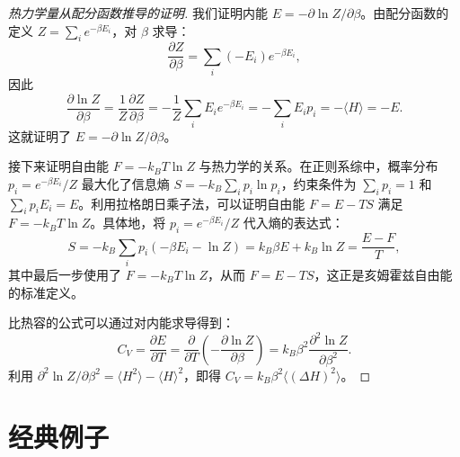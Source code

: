 \begin{proof}[热力学量从配分函数推导的证明]
我们证明内能 $E = -\partial \ln Z / \partial \beta$。由配分函数的定义 $Z = \sum_i e^{-\beta E_i}$，对 $\beta$ 求导：
\begin{equation}
    \frac{\partial Z}{\partial \beta} = \sum_i (-E_i) e^{-\beta E_i},
\end{equation}
因此
\begin{equation}
    \frac{\partial \ln Z}{\partial \beta} = \frac{1}{Z} \frac{\partial Z}{\partial \beta} = -\frac{1}{Z} \sum_i E_i e^{-\beta E_i} = -\sum_i E_i p_i = -\langle H \rangle = -E.
\end{equation}
这就证明了 $E = -\partial \ln Z / \partial \beta$。

接下来证明自由能 $F = -k_B T \ln Z$ 与热力学的关系。在正则系综中，概率分布 $p_i = e^{-\beta E_i}/Z$ 最大化了信息熵 $S = -k_B \sum_i p_i \ln p_i$，约束条件为 $\sum_i p_i = 1$ 和 $\sum_i p_i E_i = E$。利用拉格朗日乘子法，可以证明自由能 $F = E - TS$ 满足 $F = -k_B T \ln Z$。具体地，将 $p_i = e^{-\beta E_i}/Z$ 代入熵的表达式：
\begin{equation}
    S = -k_B \sum_i p_i (-\beta E_i - \ln Z) = k_B \beta E + k_B \ln Z = \frac{E - F}{T},
\end{equation}
其中最后一步使用了 $F = -k_B T \ln Z$，从而 $F = E - TS$，这正是亥姆霍兹自由能的标准定义。

比热容的公式可以通过对内能求导得到：
\begin{equation}
    C_V = \frac{\partial E}{\partial T} = \frac{\partial}{\partial T}\left(-\frac{\partial \ln Z}{\partial \beta}\right) = k_B \beta^2 \frac{\partial^2 \ln Z}{\partial \beta^2}.
\end{equation}
利用 $\partial^2 \ln Z / \partial \beta^2 = \langle H^2 \rangle - \langle H \rangle^2$，即得 $C_V = k_B \beta^2 \langle (\Delta H)^2 \rangle$。
\end{proof}

\section{经典例子}

